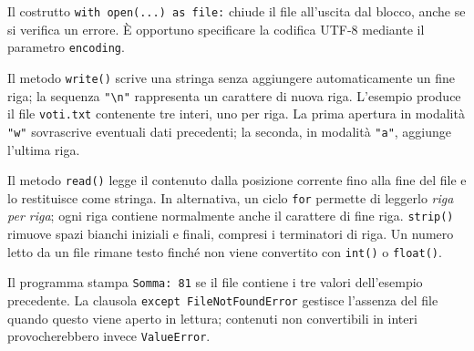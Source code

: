 Il costrutto \texttt{with open(...) as file:} chiude il file
all'uscita dal blocco, anche se si verifica un errore. È opportuno
specificare la codifica UTF-8 mediante il parametro \texttt{encoding}.



Il metodo \texttt{write()} scrive una stringa senza aggiungere
automaticamente un fine riga; la sequenza \lstinline|"\n"| rappresenta
un carattere di nuova riga. L'esempio produce il file \texttt{voti.txt}
contenente tre interi, uno per riga. La prima apertura in modalità
\lstinline|"w"| sovrascrive eventuali dati precedenti; la seconda,
in modalità \lstinline|"a"|, aggiunge l'ultima riga.

Il metodo \texttt{read()} legge il contenuto dalla posizione corrente
fino alla fine del file e lo restituisce come stringa. In alternativa,
un ciclo \texttt{for} permette di leggerlo
\emph{riga per riga}; ogni riga contiene normalmente anche il
carattere di fine riga. \texttt{strip()} rimuove spazi bianchi iniziali
e finali, compresi i terminatori di riga. Un numero letto da un file
rimane testo finché non viene convertito con \texttt{int()} o
\texttt{float()}.



Il programma stampa \texttt{Somma: 81} se il file contiene i tre
valori dell'esempio precedente. La clausola
\texttt{except FileNotFoundError} gestisce l'assenza del file quando
questo viene aperto in lettura; contenuti non convertibili in interi
provocherebbero invece \texttt{ValueError}.

